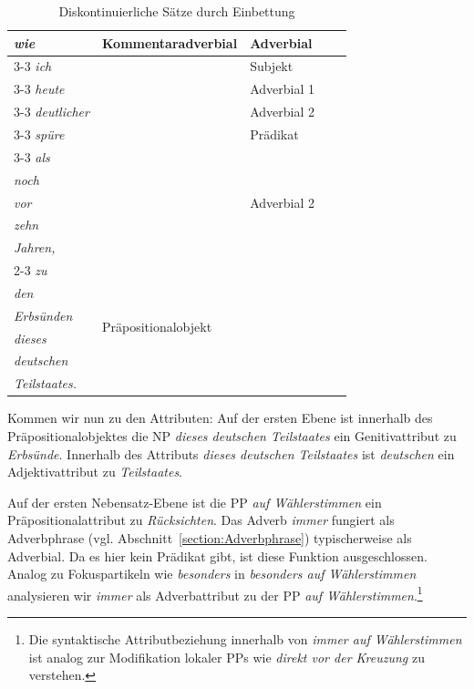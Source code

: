 \begin{table}
{\begin{tabular}{l|l|l|l|l}
    \textit{wie} & \multirow{10}{*}{Kommentaradverbial} & Adverbial & & \\ \cline{3-3}
    \textit{ich} & & Subjekt & & \\ \cline{3-3}
    \textit{heute} & & Adverbial 1 & & \\ \cline{3-3}
    \textit{deutlicher} & & Adverbial 2 & & \\ \cline{3-3}
    \textit{spüre} & & Prädikat & & \\ \cline{3-3}
    \textit{als} & & \multirow{5}{*}{Adverbial 2} & & \\ 
    \textit{noch} & & & & \\
    \textit{vor} & & & & \\ 
    \textit{zehn} & & & & \\ 
    \textit{Jahren,} & & & & \\ \cline{2-3}
    \textit{zu} & \multirow{6}{*}{Präpositionalobjekt} & & & \\ 
    \textit{den} & & & & \\
    \textit{Erbsünden} & & & & \\ 
    \textit{dieses} & & & & \\ 
    \textit{deutschen} & & & & \\ 
    \textit{Teilstaates.} & & & & \\
    \hline 
  \end{tabular}
  }
  \caption{Diskontinuierliche Sätze durch Einbettung}
  \label{tab:Mayer_Satz}
\end{table}

Kommen wir nun zu den Attributen: Auf der ersten Ebene ist innerhalb des Präpositionalobjektes die NP \textit{dieses deutschen Teilstaates} ein Genitivattribut zu \textit{Erbsünde}. Innerhalb des Attributs \textit{dieses deutschen Teilstaates} ist \textit{deutschen} ein Adjektivattribut zu \textit{Teilstaates}.

Auf der ersten Nebensatz-Ebene ist die PP \textit{auf Wählerstimmen} ein Präpositionalattribut zu \textit{Rücksichten}. Das Adverb \textit{immer} fungiert als Adverbphrase (vgl. Abschnitt~\ref{section:Adverbphrase}) typischerweise als Adverbial. Da es hier kein Prädikat gibt, ist diese Funktion ausgeschlossen. Analog zu Fokuspartikeln wie \textit{besonders} in \textit{besonders auf Wählerstimmen} analysieren wir \textit{immer} als Adverbattribut zu der PP \textit{auf Wählerstimmen}.\footnote{Die syntaktische Attributbeziehung innerhalb von \textit{immer auf Wählerstimmen} ist analog zur Modifikation lokaler PPs wie \textit{direkt vor der Kreuzung} zu verstehen.}

